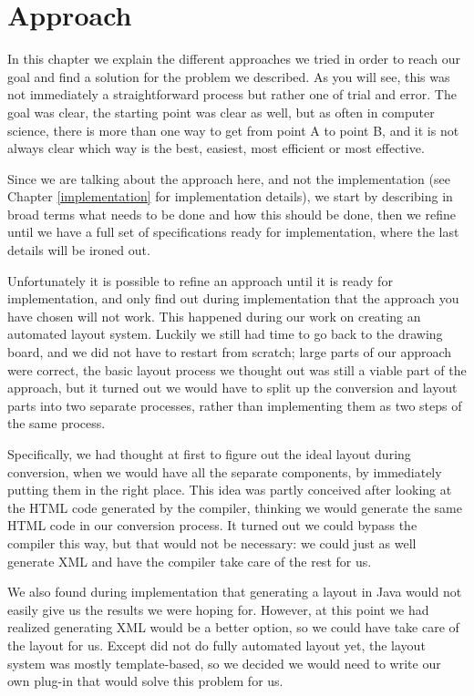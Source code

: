 
 \chapter{Approach}

  In this chapter we explain the different approaches we tried in order to
  reach our goal and find a solution for the problem we described. As you will
  see, this was not immediately a straightforward process but rather one of
  trial and error. The goal was clear, the starting point was clear as well,
  but as often in computer science, there is more than one way to get from
  point A to point B, and it is not always clear which way is the best,
  easiest, most efficient or most effective.
 
  Since we are talking about the approach here, and not the implementation (see
  Chapter \ref{implementation} for implementation details), we start by describing in broad
  terms what needs to be done and how this should be done, then we refine until
  we have a full set of specifications ready for implementation, where the last
  details will be ironed out.

  Unfortunately it is possible to refine an approach until it is ready for
  implementation, and only find out during implementation that the approach
  you have chosen will not work. This happened during our work on creating an
  automated layout system. Luckily we still had time to go back to the drawing
  board, and we did not have to restart from scratch; large parts of our
  approach were correct, the basic layout process we thought out was still a
  viable part of the approach, but it turned out we would have to split up the
  conversion and layout parts into two separate processes, rather than
  implementing them as two steps of the same process.
  
  Specifically, we had thought at first to figure out the ideal layout during
  conversion, when we would have all the separate components, by immediately
  putting them in the right place. This idea was partly conceived after looking
  at the HTML code generated by the \mxp compiler, thinking we would generate
  the same HTML code in our conversion process. It turned out we could bypass
  the \mxp compiler this way, but that would not be necessary: we could just as
  well generate \mxp XML and have the compiler take care of the rest for us.
 
  We also found during implementation that generating a layout in Java would
  not easily give us the results we were hoping for. However, at this point we
  had realized generating \mxp XML would be a better option, so we could have
  \mxp take care of the layout for us. Except \mxp did not do fully automated
  layout yet, the layout system was mostly template-based, so we decided we
  would need to write our own \mxp plug-in that would solve this problem for
  us.

